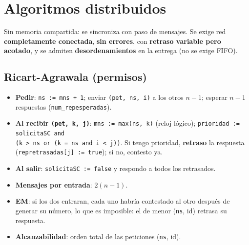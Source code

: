 \documentclass[11pt,a4paper,oneside]{report}
\begin{document}
\section{Algoritmos distribuidos}
Sin memoria compartida: se sincroniza con paso de mensajes. Se exige red \textbf{completamente conectada},
\textbf{sin errores}, con \textbf{retraso variable pero acotado}, y se admiten \textbf{desordenamientos} en la
entrega (no se exige FIFO).

\subsection{Ricart-Agrawala (permisos)}
\begin{itemize}[leftmargin=*]
  \item \textbf{Pedir}: \texttt{ns := mns + 1}; enviar \texttt{(pet, ns, i)} a los otros $n-1$; esperar
        $n-1$ respuestas (\texttt{num\_repesperadas}).
  \item \textbf{Al recibir \texttt{(pet, k, j)}}: \texttt{mns := max(ns, k)} (reloj lógico);
        \texttt{prioridad := solicitaSC and}\\ \texttt{(k > ns or (k = ns and i < j))}. Si tengo prioridad,
        \textbf{retraso} la respuesta (\texttt{repretrasadas[j] := true}); si no, contesto ya.
  \item \textbf{Al salir}: \texttt{solicitaSC := false} y respondo a todos los retrasados.
  \item \textbf{Mensajes por entrada}: $2(n-1)$.
  \item \textbf{EM}: si los dos entraran, cada uno habría contestado al otro después de generar su número, lo que
        es imposible: el de menor (\texttt{ns}, id) retrasa su respuesta.
  \item \textbf{Alcanzabilidad}: orden total de las peticiones (\texttt{ns}, id).
\end{itemize}
\end{document}
